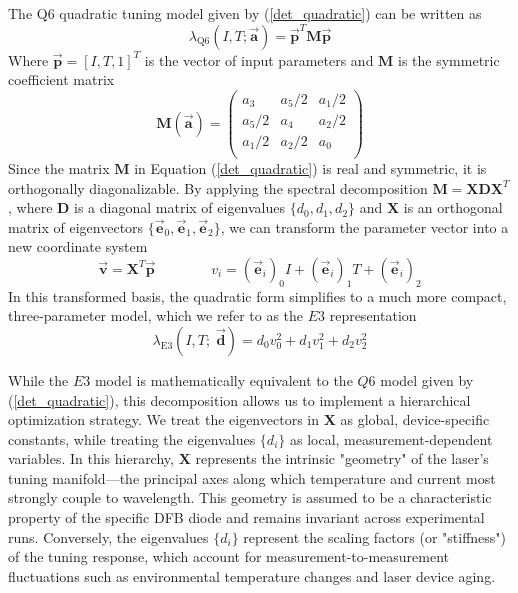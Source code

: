 \documentclass[8pt,a4paper]{report}
\begin{document}
	The Q6 quadratic tuning model given by (\ref{det_quadratic}) can be written as
	\begin{equation}
		\lambda_\mathrm{Q6}(I, T; \vec{\mathbf{a}}) = \vec{\mathbf{p}}^T \mathbf{M} \vec{\mathbf{p}}
	\end{equation}
	Where $\vec{\mathbf{p}} = [I, T, 1]^T$ is the vector of input parameters and $\mathbf{M}$ is the symmetric coefficient matrix
	\begin{equation} \label{det_coeff_mat_a}
		\mathbf{M}(\vec{\textbf{a}}) = 
		\begin{pmatrix}
			a_3 & a_5/2 & a_1/2 \\
			a_5/2 & a_4 & a_2/2 \\
			a_1/2 & a_2/2 & a_0 \\
		\end{pmatrix}
	\end{equation}
	Since the matrix $\mathbf{M}$ in Equation (\ref{det_quadratic}) is real and symmetric, it is orthogonally diagonalizable. By applying the spectral decomposition $\mathbf{M} = \mathbf{X}\mathbf{D}\mathbf{X}^T$, where $\mathbf{D}$ is a diagonal matrix of eigenvalues $\{d_0, d_1, d_2\}$ and $\mathbf{X}$ is an orthogonal matrix of eigenvectors $\{\vec{\mathbf{e}}_0, \vec{\mathbf{e}}_1, \vec{\mathbf{e}}_2\}$, we can transform the parameter vector into a new coordinate system
	\begin{equation}
		\vec{\mathbf{v}} = \mathbf{X}^T \vec{\mathbf{p}}
		\qquad \qquad
		v_i = \left(\vec{\textbf{e}}_i\right)_0 I + \left(\vec{\textbf{e}}_i\right)_1 T + \left(\vec{\textbf{e}}_i\right)_2
	\end{equation}
	In this transformed basis, the quadratic form simplifies to a much more compact, three-parameter model, which we refer to as the $E3$ representation
	\begin{equation} \label{det_eigenModel}
		\lambda_\mathrm{E3}(I, T;\; \vec{\textbf{d}}) = d_0 v_0^2 + d_1 v_1^2 + d_2 v_2^2
	\end{equation}
	
	While the $E3$ model is mathematically equivalent to the $Q6$ model given by (\ref{det_quadratic}), this decomposition allows us to implement a hierarchical optimization strategy. We treat the eigenvectors in $\mathbf{X}$ as global, device-specific constants, while treating the eigenvalues $\{d_i\}$ as local, measurement-dependent variables. In this hierarchy, $\mathbf{X}$ represents the intrinsic "geometry" of the laser's tuning manifold—the principal axes along which temperature and current most strongly couple to wavelength. This geometry is assumed to be a characteristic property of the specific DFB diode and remains invariant across experimental runs. Conversely, the eigenvalues $\{d_i\}$ represent the scaling factors (or "stiffness") of the tuning response, which account for measurement-to-measurement fluctuations such as environmental temperature changes and laser device aging.
	
\end{document}

